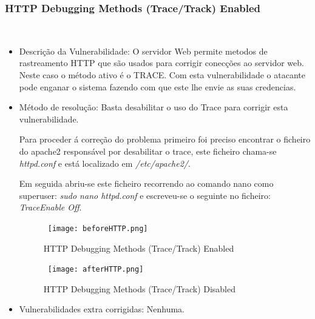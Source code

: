 \subsubsection{HTTP Debugging Methods (Trace/Track) Enabled}
\hfill\\
\begin{itemize}
\item Descrição da Vulnerabilidade: O servidor Web permite metodos de rastreamento HTTP que são usados para corrigir conecções ao servidor web.
Neste caso o método ativo é o TRACE. Com esta vulnerabilidade o atacante pode enganar o sistema fazendo com que este lhe envie as suas credencias.

\item Método de resolução: Basta desabilitar o uso do Trace para corrigir esta vulnerabilidade.

\par Para proceder á correção do problema primeiro foi preciso encontrar o ficheiro do apache2 responsável por desabilitar o trace, este ficheiro chama-se \textit{httpd.conf} e está localizado em \textit{/etc/apache2/}.
\par Em seguida abriu-se este ficheiro recorrendo ao comando nano como superuser: \textit{sudo nano httpd.conf} e escreveu-se o seguinte no ficheiro: \textit{TraceEnable Off}.

\begin{figure}[H]

  \centering

  \hbox{\hspace{-6em} \texttt{[image: beforeHTTP.png]}}

  \caption {HTTP Debugging Methods (Trace/Track) Enabled}

  \label {fig3}

\end{figure}
\begin{figure}[H]

  \centering

  \hbox{\hspace{-6em} \texttt{[image: afterHTTP.png]}}

  \caption {HTTP Debugging Methods (Trace/Track) Disabled}

  \label {fig3}

\end{figure}
\item Vulnerabilidades extra corrigidas: Nenhuma.
\end{itemize}

